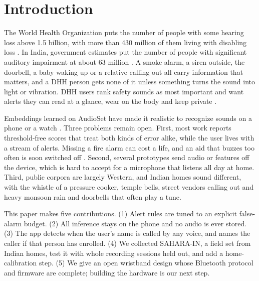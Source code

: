 \documentclass[conference,a4paper]{IEEEtran}
\begin{document}
\section{Introduction}
The World Health Organization puts the number of people with some hearing loss above 1.5 billion, with more than 430 million of them living with disabling loss \cite{who2021}. In India, government estimates put the number of people with significant auditory impairment at about 63 million \cite{nppcd}. A smoke alarm, a siren outside, the doorbell, a baby waking up or a relative calling out all carry information that matters, and a DHH person gets none of it unless something turns the sound into light or vibration. DHH users rank safety sounds as most important and want alerts they can read at a glance, wear on the body and keep private \cite{bragg2016,findlater2019,goodman2020}.

Embeddings learned on AudioSet \cite{gemmeke2017} have made it realistic to recognize sounds on a phone or a watch \cite{jain2020homesound,jain2020soundwatch,jain2022protosound,laput2018}. Three problems remain open. First, most work reports threshold-free scores that treat both kinds of error alike, while the user lives with a stream of alerts. Missing a fire alarm can cost a life, and an aid that buzzes too often is soon switched off \cite{jain2020homesound,huang2023}. Second, several prototypes send audio or features off the device, which is hard to accept for a microphone that listens all day at home. Third, public corpora are largely Western, and Indian homes sound different, with the whistle of a pressure cooker, temple bells, street vendors calling out and heavy monsoon rain and doorbells that often play a tune.

This paper makes five contributions. (1) Alert rules are tuned to an explicit false-alarm budget. (2) All inference stays on the phone and no audio is ever stored. (3) The app detects when the user's name is called by any voice, and names the caller if that person has enrolled. (4) We collected SAHARA-IN, a field set from Indian homes, test it with whole recording sessions held out, and add a home-calibration step. (5) We give an open wristband design whose Bluetooth protocol and firmware are complete; building the hardware is our next step.
\end{document}
